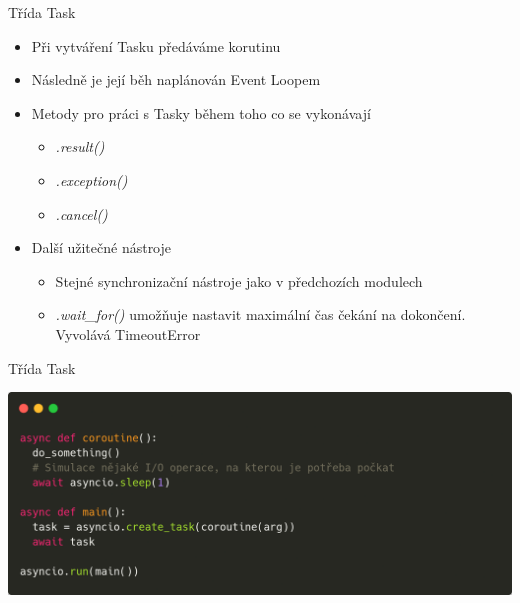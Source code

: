 \documentclass{beamer}
\begin{document}
\begin{frame}{Třída Task}
    \begin{itemize}
        \item Při vytváření Tasku předáváme korutinu
        \item Následně je její běh naplánován Event Loopem
        \item Metody pro práci s Tasky během toho co se vykonávají
        \begin{itemize}
            \item \textit{.result()}
            \item \textit{.exception()}
            \item \textit{.cancel()}
        \end{itemize}
        
        \vskip 0.25in
        \item Další užitečné nástroje
        \begin{itemize}
            \item Stejné synchronizační nástroje jako v předchozích modulech

            \item \textit{.wait\_for()} umožňuje nastavit maximální čas čekání na dokončení. Vyvolává TimeoutError
        \end{itemize}
    \end{itemize}
\end{frame}

\begin{frame}[fragile]{Třída Task}
    \scriptsize
    \begin{center}
        \includegraphics[width=\textwidth]{obrazky/codes/carbon9.png}
    \end{center}
\end{frame}
\end{document}
